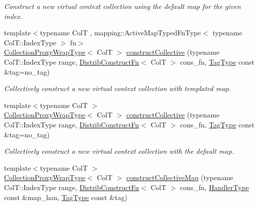 \begin{DoxyCompactItemize}
\begin{DoxyCompactList}\small\item\em Construct a new virtual context collection using the default map for the given index. \end{DoxyCompactList}\item 
{\footnotesize template$<$typename ColT , mapping\+::\+Active\+Map\+Typed\+Fn\+Type$<$ typename Col\+T\+::\+Index\+Type $>$ fn$>$ }\\\hyperlink{structvt_1_1vrt_1_1collection_1_1_collection_manager_a56458ed7f9bb22b631b9b3a745f42f94}{Collection\+Proxy\+Wrap\+Type}$<$ ColT $>$ \hyperlink{structvt_1_1vrt_1_1collection_1_1_collection_manager_a619d6e576f0d108e442b16ca4f68f1f3}{construct\+Collective} (typename Col\+T\+::\+Index\+Type range, \hyperlink{structvt_1_1vrt_1_1collection_1_1_collection_manager_a7503830bc133013d542856fa39834dcc}{Distrib\+Construct\+Fn}$<$ ColT $>$ cons\+\_\+fn, \hyperlink{namespacevt_a84ab281dae04a52a4b243d6bf62d0e52}{Tag\+Type} const \&tag=no\+\_\+tag)
\begin{DoxyCompactList}\small\item\em Collectively construct a new virtual context collection with templated map. \end{DoxyCompactList}\item 
{\footnotesize template$<$typename ColT $>$ }\\\hyperlink{structvt_1_1vrt_1_1collection_1_1_collection_manager_a56458ed7f9bb22b631b9b3a745f42f94}{Collection\+Proxy\+Wrap\+Type}$<$ ColT $>$ \hyperlink{structvt_1_1vrt_1_1collection_1_1_collection_manager_ad68e773af13eaa96e58910b14264e8cb}{construct\+Collective} (typename Col\+T\+::\+Index\+Type range, \hyperlink{structvt_1_1vrt_1_1collection_1_1_collection_manager_a7503830bc133013d542856fa39834dcc}{Distrib\+Construct\+Fn}$<$ ColT $>$ cons\+\_\+fn, \hyperlink{namespacevt_a84ab281dae04a52a4b243d6bf62d0e52}{Tag\+Type} const \&tag=no\+\_\+tag)
\begin{DoxyCompactList}\small\item\em Collectively construct a new virtual context collection with the default map. \end{DoxyCompactList}\item 
{\footnotesize template$<$typename ColT $>$ }\\\hyperlink{structvt_1_1vrt_1_1collection_1_1_collection_manager_a56458ed7f9bb22b631b9b3a745f42f94}{Collection\+Proxy\+Wrap\+Type}$<$ ColT $>$ \hyperlink{structvt_1_1vrt_1_1collection_1_1_collection_manager_ae4f96ce01b13d68e5f3a8be7bea7e439}{construct\+Collective\+Map} (typename Col\+T\+::\+Index\+Type range, \hyperlink{structvt_1_1vrt_1_1collection_1_1_collection_manager_a7503830bc133013d542856fa39834dcc}{Distrib\+Construct\+Fn}$<$ ColT $>$ cons\+\_\+fn, \hyperlink{namespacevt_af64846b57dfcaf104da3ef6967917573}{Handler\+Type} const \&map\+\_\+han, \hyperlink{namespacevt_a84ab281dae04a52a4b243d6bf62d0e52}{Tag\+Type} const \&tag)

\end{DoxyCompactItemize}
